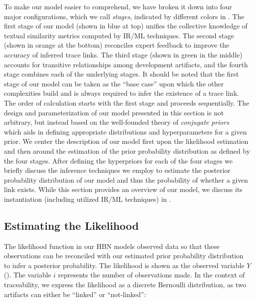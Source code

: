 To make our model easier to comprehend, we have broken it down into four major configurations, which we call \textit{stages}, indicated by different colors in . The first stage of our model (shown in blue at top) unifies the collective knowledge of textual similarity metrics computed by IR/ML techniques. The second stage (shown in orange at the bottom) reconciles expert feedback to improve the accuracy of inferred trace links. The third stage (shown in green in the middle) accounts for transitive relationships among development artifacts, and the fourth stage combines each of the underlying stages. It should be noted that the first stage of our model can be taken as the ``base case'' upon which the other complexities build and is always required to infer the existence of a trace link.  The order of calculation starts with the first stage and proceeds sequentially. The design and parameterization of our model presented in this section is not arbitrary, but instead based on the well-founded theory of \textit{conjugate priors}~\citep{Raiffa:61} which aids in defining appropriate distributions and hyperparameters for a given prior. We center the description of our model first upon the likelihood estimation and then around the estimation of the prior probability distribution as defined by the four stages. After defining the hyperpriors for each of the four stages we briefly discuss the inference techniques we employ to estimate the posterior probability distribution of our model and thus the probability of whether a given link exists. While this section provides an overview of our model, we discuss its instantiation (including utilized IR/ML techniques) in .


\subsection{Estimating the Likelihood}
\label{sub:model-likelihood}

The likelihood function in our HBN models observed data so that these observations can be reconciled with our estimated prior probability distribution to infer a posterior probability.  The likelihood is shown as the observed variable $Y$ (). The variable $i$ represents the number of observations made. In the context of traceability, we express the likelihood as a discrete Bernoulli distribution, as two artifacts can either be ``linked'' or ``not-linked'':


